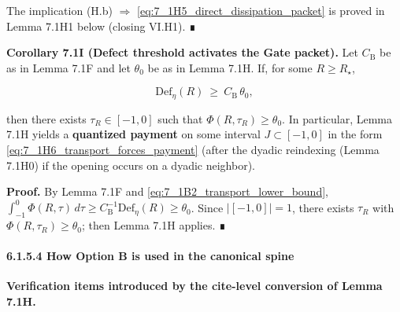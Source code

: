 \documentclass[
  11pt,
]{article}
\begin{document}
The implication (H.b) \(\Rightarrow\) \eqref{eq:7_1H5_direct_dissipation_packet} is proved in Lemma 7.1H1 below (closing VI.H1). ∎

\textbf{Corollary 7.1I (Defect threshold activates the Gate packet).} Let \(C_{\mathrm{B}}\) be as in Lemma 7.1F and let \(\theta_0\) be as in Lemma 7.1H. If, for some \(R\ge R_\star\),

\begin{equation}
\mathrm{Def}_\eta(R)\ \ge\ C_{\mathrm{B}}\,\theta_0,
\tag{7.1I1}\label{eq:7_1I1_defect_threshold}
\end{equation}

then there exists \(\tau_R\in[-1,0]\) such that \(\Phi(R,\tau_R)\ge\theta_0\). In particular, Lemma 7.1H yields a \textbf{quantized payment} on some interval \(J\subset[-1,0]\) in the form \eqref{eq:7_1H6_transport_forces_payment} (after the dyadic reindexing (Lemma 7.1H0) if the opening occurs on a dyadic neighbor).

\textbf{Proof.} By Lemma 7.1F and \eqref{eq:7_1B2_transport_lower_bound}, \(\int_{-1}^0\Phi(R,\tau)\,d\tau\ge C_{\mathrm{B}}^{-1}\mathrm{Def}_\eta(R)\ge\theta_0\). Since \(|[-1,0]|=1\), there exists \(\tau_R\) with \(\Phi(R,\tau_R)\ge\theta_0\); then Lemma 7.1H applies. ∎

\hypertarget{how-option-b-is-used-in-the-canonical-spine}{%
\paragraph{6.1.5.4 How Option B is used in the canonical spine}\label{how-option-b-is-used-in-the-canonical-spine}}

\textbf{Verification items introduced by the cite-level conversion of Lemma 7.1H.}
\end{document}

